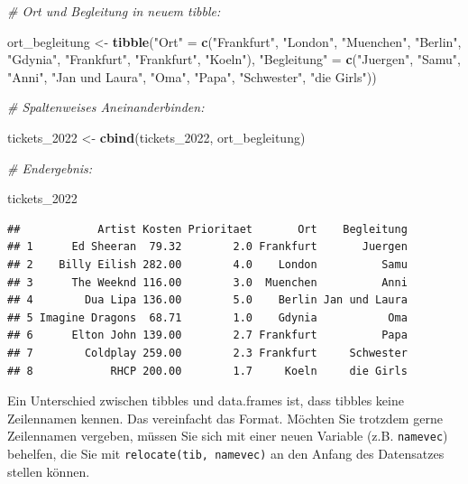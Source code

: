 \documentclass[
  ngerman,
]{book}
\newenvironment{Shaded}{\begin{snugshade}}{\end{snugshade}}
\newcommand{\CommentTok}[1]{\textcolor[rgb]{0.56,0.35,0.01}{\textit{#1}}}
\newcommand{\FunctionTok}[1]{\textcolor[rgb]{0.13,0.29,0.53}{\textbf{#1}}}
\newcommand{\NormalTok}[1]{#1}
\newcommand{\OtherTok}[1]{\textcolor[rgb]{0.56,0.35,0.01}{#1}}
\newcommand{\StringTok}[1]{\textcolor[rgb]{0.31,0.60,0.02}{#1}}
\begin{document}
\begin{Shaded}
\begin{Highlighting}[]
\CommentTok{\# Ort und Begleitung in neuem tibble:}

\NormalTok{ort\_begleitung }\OtherTok{\textless{}{-}} \FunctionTok{tibble}\NormalTok{(}\StringTok{"Ort"} \OtherTok{=} \FunctionTok{c}\NormalTok{(}\StringTok{"Frankfurt"}\NormalTok{, }\StringTok{"London"}\NormalTok{, }\StringTok{"Muenchen"}\NormalTok{, }\StringTok{"Berlin"}\NormalTok{, }\StringTok{"Gdynia"}\NormalTok{, }\StringTok{"Frankfurt"}\NormalTok{, }\StringTok{"Frankfurt"}\NormalTok{, }\StringTok{"Koeln"}\NormalTok{),}
                         \StringTok{"Begleitung"} \OtherTok{=} \FunctionTok{c}\NormalTok{(}\StringTok{"Juergen"}\NormalTok{, }\StringTok{"Samu"}\NormalTok{, }\StringTok{"Anni"}\NormalTok{, }\StringTok{"Jan und Laura"}\NormalTok{, }\StringTok{"Oma"}\NormalTok{, }\StringTok{"Papa"}\NormalTok{, }\StringTok{"Schwester"}\NormalTok{, }\StringTok{"die Girls"}\NormalTok{))}

\CommentTok{\# Spaltenweises Aneinanderbinden:}

\NormalTok{tickets\_2022 }\OtherTok{\textless{}{-}} \FunctionTok{cbind}\NormalTok{(tickets\_2022, ort\_begleitung)}

\CommentTok{\# Endergebnis:}

\NormalTok{tickets\_2022}
\end{Highlighting}
\end{Shaded}

\begin{verbatim}
##            Artist Kosten Prioritaet       Ort    Begleitung
## 1      Ed Sheeran  79.32        2.0 Frankfurt       Juergen
## 2    Billy Eilish 282.00        4.0    London          Samu
## 3      The Weeknd 116.00        3.0  Muenchen          Anni
## 4        Dua Lipa 136.00        5.0    Berlin Jan und Laura
## 5 Imagine Dragons  68.71        1.0    Gdynia           Oma
## 6      Elton John 139.00        2.7 Frankfurt          Papa
## 7        Coldplay 259.00        2.3 Frankfurt     Schwester
## 8            RHCP 200.00        1.7     Koeln     die Girls
\end{verbatim}

Ein Unterschied zwischen tibbles und data.frames ist, dass tibbles keine Zeilennamen kennen. Das vereinfacht das Format. Möchten Sie trotzdem gerne Zeilennamen vergeben, müssen Sie sich mit einer neuen Variable (z.B. \texttt{namevec}) behelfen, die Sie mit \texttt{relocate(tib,\ namevec)} an den Anfang des Datensatzes stellen können.
\end{document}
